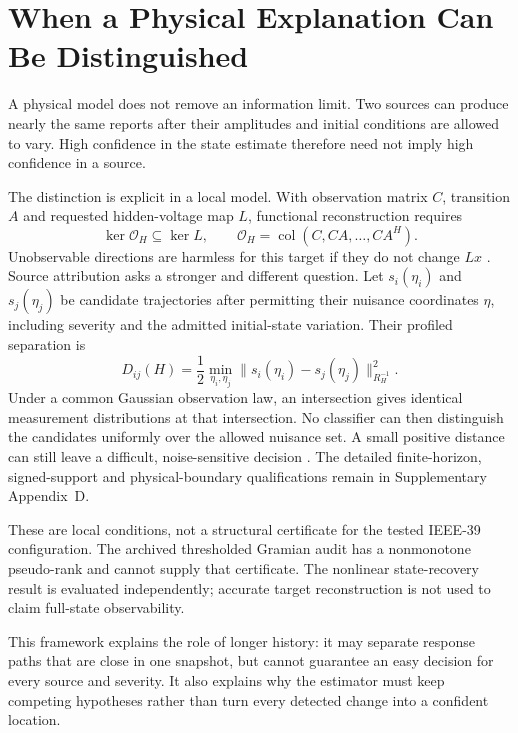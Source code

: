 \section{When a Physical Explanation Can Be Distinguished}
\label{sec:narrative-information}

A physical model does not remove an information limit. Two sources can produce nearly the same reports after their amplitudes and initial conditions are allowed to vary. High confidence in the state estimate therefore need not imply high confidence in a source.

The distinction is explicit in a local model. With observation matrix $C$, transition $A$ and requested hidden-voltage map $L$, functional reconstruction requires
\begin{equation}
 \ker\mathcal O_H\subseteq\ker L,\qquad
 \mathcal O_H=\operatorname{col}(C,CA,\ldots,CA^H).
 \label{eq:narrative-functional}
\end{equation}
Unobservable directions are harmless for this target if they do not change $Lx$ \cite{fernando2010functional,montanari2022functional}. Source attribution asks a stronger and different question. Let $s_i(\eta_i)$ and $s_j(\eta_j)$ be candidate trajectories after permitting their nuisance coordinates $\eta$, including severity and the admitted initial-state variation. Their profiled separation is
\begin{equation}
 D_{ij}(H)=\frac12\min_{\eta_i,\eta_j}
 \|s_i(\eta_i)-s_j(\eta_j)\|_{R_H^{-1}}^2.
 \label{eq:narrative-separation}
\end{equation}
Under a common Gaussian observation law, an intersection gives identical measurement distributions at that intersection. No classifier can then distinguish the candidates uniformly over the allowed nuisance set. A small positive distance can still leave a difficult, noise-sensitive decision \cite{eriksson2013diagnosability,scharf1994matched}. The detailed finite-horizon, signed-support and physical-boundary qualifications remain in Supplementary Appendix~D.

These are local conditions, not a structural certificate for the tested IEEE-39 configuration. The archived thresholded Gramian audit has a nonmonotone pseudo-rank and cannot supply that certificate. The nonlinear state-recovery result is evaluated independently; accurate target reconstruction is not used to claim full-state observability.

This framework explains the role of longer history: it may separate response paths that are close in one snapshot, but cannot guarantee an easy decision for every source and severity. It also explains why the estimator must keep competing hypotheses rather than turn every detected change into a confident location.

